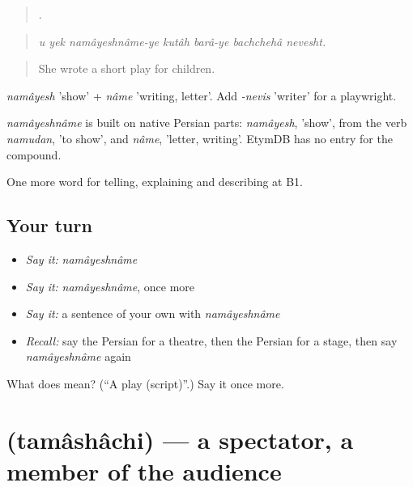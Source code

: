 \begin{quote}
       .
\end{quote}

\begin{quote}
\emph{u yek namâyeshnâme-ye kutâh barâ-ye bachchehâ nevesht.}
\end{quote}

\begin{quote}
She wrote a short play for children.
\end{quote}

\emph{namâyesh} 'show' + \emph{nâme} 'writing, letter'. Add \emph{-nevis} 'writer' for a playwright.

\begin{cousinweb}
\emph{namâyeshnâme} is built on native Persian parts: \emph{namâyesh}, 'show', from the verb \emph{namudan}, 'to show', and \emph{nâme}, 'letter, writing'. EtymDB has no entry for the compound.
\end{cousinweb}

\begin{grammarlens}[title={What you've built}]
One more word for telling, explaining and describing at B1.
\end{grammarlens}

\subsection*{Your turn}
\begin{itemize}
\raggedright
  \item \emph{Say it:} \emph{namâyeshnâme}
  \item \emph{Say it:} \emph{namâyeshnâme}, once more
  \item \emph{Say it:} a sentence of your own with \emph{namâyeshnâme}
  \item \emph{Recall:} say the Persian for a theatre, then the Persian for a stage, then say \emph{namâyeshnâme} again
\end{itemize}

\begin{tcolorbox}[breakable,colback=teal!4,colframe=teal!35!black,title={Before you move on}]
What does  mean? (\textquotedblleft{}A play (script)\textquotedblright{}.) Say it once more.
\end{tcolorbox}
\section[\texorpdfstring{\fa{تماشاچی} (tamâshâchi)}{تماشاچی (tamâshâchi)}]{ (tamâshâchi) — a spectator, a member of the audience}

